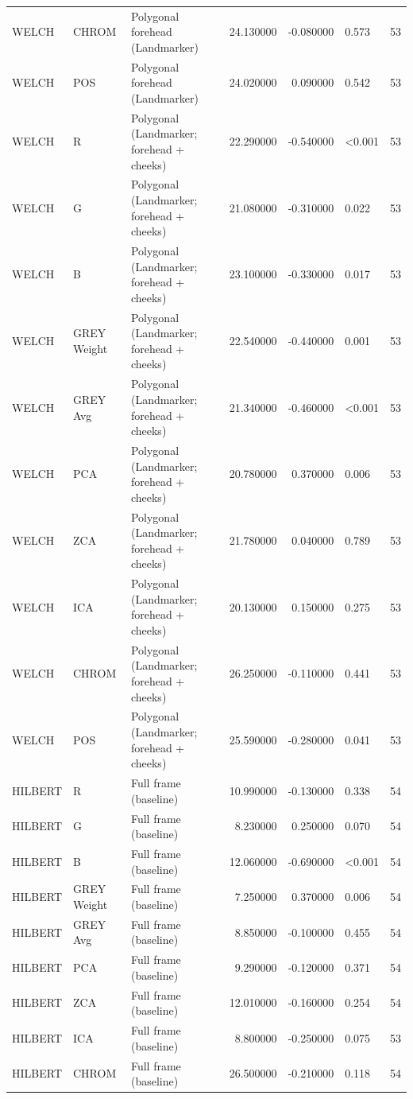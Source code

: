 \begin{table}[htbp]
\begin{tabular}{l l l r r l r}
WELCH & CHROM & Polygonal forehead (Landmarker) & 24.130000 & -0.080000 & 0.573 & 53 \\
WELCH & POS & Polygonal forehead (Landmarker) & 24.020000 & 0.090000 & 0.542 & 53 \\
WELCH & R & Polygonal (Landmarker; forehead + cheeks) & 22.290000 & -0.540000 & <0.001 & 53 \\
WELCH & G & Polygonal (Landmarker; forehead + cheeks) & 21.080000 & -0.310000 & 0.022 & 53 \\
WELCH & B & Polygonal (Landmarker; forehead + cheeks) & 23.100000 & -0.330000 & 0.017 & 53 \\
WELCH & GREY Weight & Polygonal (Landmarker; forehead + cheeks) & 22.540000 & -0.440000 & 0.001 & 53 \\
WELCH & GREY Avg & Polygonal (Landmarker; forehead + cheeks) & 21.340000 & -0.460000 & <0.001 & 53 \\
WELCH & PCA & Polygonal (Landmarker; forehead + cheeks) & 20.780000 & 0.370000 & 0.006 & 53 \\
WELCH & ZCA & Polygonal (Landmarker; forehead + cheeks) & 21.780000 & 0.040000 & 0.789 & 53 \\
WELCH & ICA & Polygonal (Landmarker; forehead + cheeks) & 20.130000 & 0.150000 & 0.275 & 53 \\
WELCH & CHROM & Polygonal (Landmarker; forehead + cheeks) & 26.250000 & -0.110000 & 0.441 & 53 \\
WELCH & POS & Polygonal (Landmarker; forehead + cheeks) & 25.590000 & -0.280000 & 0.041 & 53 \\
HILBERT & R & Full frame (baseline) & 10.990000 & -0.130000 & 0.338 & 54 \\
HILBERT & G & Full frame (baseline) & 8.230000 & 0.250000 & 0.070 & 54 \\
HILBERT & B & Full frame (baseline) & 12.060000 & -0.690000 & <0.001 & 54 \\
HILBERT & GREY Weight & Full frame (baseline) & 7.250000 & 0.370000 & 0.006 & 54 \\
HILBERT & GREY Avg & Full frame (baseline) & 8.850000 & -0.100000 & 0.455 & 54 \\
HILBERT & PCA & Full frame (baseline) & 9.290000 & -0.120000 & 0.371 & 54 \\
HILBERT & ZCA & Full frame (baseline) & 12.010000 & -0.160000 & 0.254 & 54 \\
HILBERT & ICA & Full frame (baseline) & 8.800000 & -0.250000 & 0.075 & 53 \\
HILBERT & CHROM & Full frame (baseline) & 26.500000 & -0.210000 & 0.118 & 54 \\

\end{tabular}
\end{table}
